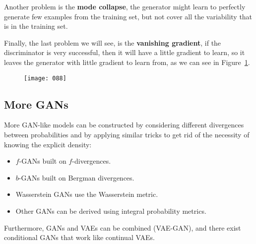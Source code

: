Another problem is the \textbf{mode collapse}, the generator might learn to perfectly generate few examples from the training set, but not cover all the variability that is in the training set.

Finally, the last problem we will see, is the \textbf{vanishing gradient}, if the discriminator is very successful, then it will have a little gradient to learn, so it leaves the generator with little gradient to learn from, as we can see in Figure~\ref{fig:088}.

\begin{figure}[h!]
    \centering
    \texttt{[image: 088]}
    \caption{}
    \label{fig:088}
\end{figure}

\subsection{More GANs}
More GAN-like models can be constructed by considering different divergences between probabilities and by applying similar tricks to get rid of the necessity of knowing the explicit density:
\begin{itemize}[topsep={0pt}, partopsep={0pt}]
    \itemsep0pt
    \item \(f\)-GANs built on \(f\)-divergences.
    \item \(b\)-GANs built on Bergman divergences.
    \item Wasserstein GANs use the Wasserstein metric.
    \item Other GANs can be derived using integral probability metrics.
\end{itemize}
Furthermore, GANs and VAEs can be combined (VAE-GAN), and there exist conditional GANs that work like continual VAEs.